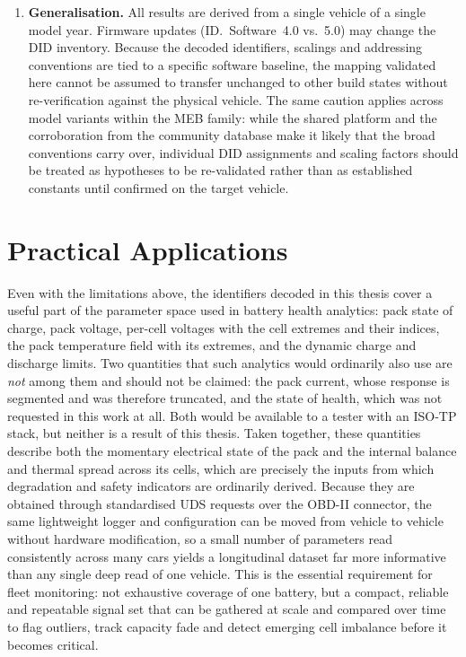 \documentclass[11pt,a4paper,oneside,parskip=half]{scrreprt}
\begin{document}
\begin{enumerate}
  \item \textbf{Generalisation.} All results are derived from a single vehicle of a single model year. Firmware updates (ID.~Software~4.0 vs.\ 5.0) may change the DID inventory. Because the decoded identifiers, scalings and addressing conventions are tied to a specific software baseline, the mapping validated here cannot be assumed to transfer unchanged to other build states without re-verification against the physical vehicle. The same caution applies across model variants within the MEB family: while the shared platform and the corroboration from the community database make it likely that the broad conventions carry over, individual DID assignments and scaling factors should be treated as hypotheses to be re-validated rather than as established constants until confirmed on the target vehicle.
\end{enumerate}

\section{Practical Applications}
Even with the limitations above, the identifiers decoded in this thesis cover a useful part of the parameter space used in battery health analytics: pack state of charge, pack voltage, per-cell voltages with the cell extremes and their indices, the pack temperature field with its extremes, and the dynamic charge and discharge limits. Two quantities that such analytics would ordinarily also use are \emph{not} among them and should not be claimed: the pack current, whose response is segmented and was therefore truncated, and the state of health, which was not requested in this work at all. Both would be available to a tester with an ISO-TP stack, but neither is a result of this thesis. Taken together, these quantities describe both the momentary electrical state of the pack and the internal balance and thermal spread across its cells, which are precisely the inputs from which degradation and safety indicators are ordinarily derived. Because they are obtained through standardised UDS requests over the OBD-II connector, the same lightweight logger and configuration can be moved from vehicle to vehicle without hardware modification, so a small number of parameters read consistently across many cars yields a longitudinal dataset far more informative than any single deep read of one vehicle. This is the essential requirement for fleet monitoring: not exhaustive coverage of one battery, but a compact, reliable and repeatable signal set that can be gathered at scale and compared over time to flag outliers, track capacity fade and detect emerging cell imbalance before it becomes critical.
\end{document}
